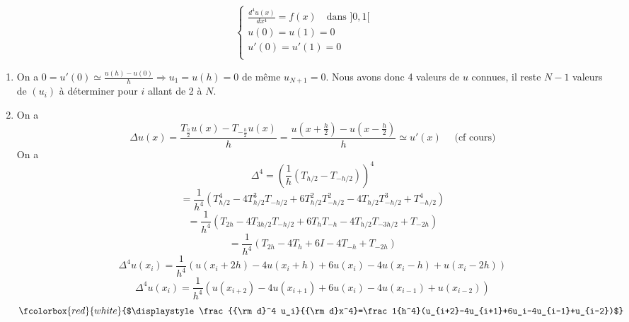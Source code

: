 \documentclass[a4paper,11pt]{article}
\def \de {{\rm d}}
\newcommand{\myredbox}[1]{\fcolorbox{red}{white}{$\displaystyle#1$}}
\begin{document}
\[\left\{\begin{array}{l}
\frac{d^4u(x)}{dx^4}=f(x)\quad\mbox{dans }]0,1[\\
u(0)=u(1)=0\\
u'(0)=u'(1)=0\\
\end{array}\right.
\]

\begin{enumerate}
\item On a $0=u'(0)\simeq \frac{u(h)-u(0)}{h}\Longrightarrow u_1=u(h)=0$ de même $u_{N+1}=0$. Nous avons donc 4 valeurs de $u$ connues, il reste $N-1$ valeurs de $(u_i)$ à déterminer pour $i$ allant de 2 à $N$. 

\item On a
\[\Delta u(x)= \frac{T_{\frac h2}u(x)-T_{-\frac h2}u(x)}{h}= \frac{u(x+\frac h2)-u(x-\frac h2)}{h}\simeq u'(x)\quad\mbox{ (cf cours)}\]
On a
\[\Delta^4=\left(\frac 1h(T_{h/2}-T_{-h/2})\right)^4\]\[=\frac 1{h^4}(T^4_{h/2}-4T^3_{h/2}T_{-h/2}+6T^2_{h/2}T^2_{-h/2}-4T_{h/2}T^3_{-h/2}+T^4_{-h/2})\]
\[=\frac 1{h^4}(T_{2h}-4T_{3h/2}T_{-h/2}+6T_{h}T_{-h}-4T_{h/2}T_{-3h/2}+T_{-2h})\]
\[=\frac 1{h^4}(T_{2h}-4T_{h}+6I-4T_{-h}+T_{-2h})\]
\[\Delta^4u(x_i)=\frac 1{h^4}(u(x_i+2h)-4u(x_i+h)+6u(x_i)-4u(x_i-h)+u(x_i-2h))\]
\[\Delta^4u(x_i)=\frac 1{h^4}(u(x_{i+2})-4u(x_{i+1})+6u(x_i)-4u(x_{i-1})+u(x_{i-2}))\]
\[\myredbox{\frac{\de^4 u_i}{\de x^4}=\frac 1{h^4}(u_{i+2}-4u_{i+1}+6u_i-4u_{i-1}+u_{i-2})}\]



\end{enumerate}
\end{document}

